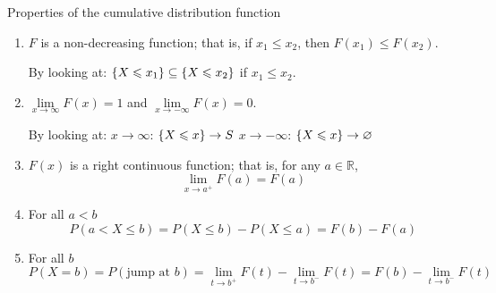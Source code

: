 \begin{Definition}{Properties of the cumulative distribution function}{}
    \begin{enumerate}[label=(\arabic*)]
        \item $ F $ is a non-decreasing function; that is, if $ x_1\leqslant x_2 $,
              then $ F(x_1)\leqslant F(x_2) $.

              By looking at:
              $ \{X\leqslant x_1\}\subseteq \{X\leqslant x_2\} $
              if $ x_1\leqslant x_2 $.
        \item $ \lim\limits_{{x} \to {\infty}} F(x)=1 $
              and $ \lim\limits_{{x} \to {-\infty}} F(x)=0 $.

              By looking at:
              $ x\to\infty $: $ \{X\leqslant x\}\to S $
              $ x\to-\infty $: $ \{X\leqslant x\}\to \varnothing $
        \item $ F(x) $ is a right continuous function; that is,
              for any $ a\in\mathbb{R} $,
              \[ \lim\limits_{{x} \to {a^+}} F(a)=F(a) \]
        \item For all $ a<b $
              \[ P(a<X\leqslant b)=P(X\leqslant b)-P(X\leqslant a)=F(b)-F(a) \]
        \item For all $ b $
              \[ P(X=b)=P(\text{jump at }b)=\lim\limits_{{t} \to {b^+}} F(t)-
                  \lim\limits_{{t} \to {b^-}} F(t)=F(b)-\lim\limits_{{t} \to {b^-}} F(t) \]
    \end{enumerate}
\end{Definition}
